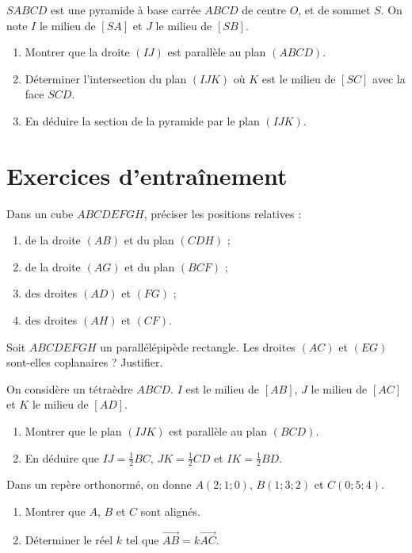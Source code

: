 \exo{}
$SABCD$ est une pyramide à base carrée $ABCD$ de centre $O$, et de sommet $S$. On note $I$ le milieu de $[SA]$ et $J$ le milieu de $[SB]$.
\begin{enumerate}[label=\alph*)]
\item Montrer que la droite $(IJ)$ est parallèle au plan $(ABCD)$.
\item Déterminer l'intersection du plan $(IJK)$ où $K$ est le milieu de $[SC]$ avec la face $SCD$.
\item En déduire la section de la pyramide par le plan $(IJK)$.
\end{enumerate}

\section{Exercices d'entraînement}


\exo{}
Dans un cube $ABCDEFGH$, préciser les positions relatives :
\begin{enumerate}[label=\alph*)]
\item de la droite $(AB)$ et du plan $(CDH)$ ;
\item de la droite $(AG)$ et du plan $(BCF)$ ;
\item des droites $(AD)$ et $(FG)$ ;
\item des droites $(AH)$ et $(CF)$.
\end{enumerate}

\exo{}
Soit $ABCDEFGH$ un parallélépipède rectangle. Les droites $(AC)$ et $(EG)$ sont-elles coplanaires ? Justifier.

\exo{}
On considère un tétraèdre $ABCD$. $I$ est le milieu de $[AB]$, $J$ le milieu de $[AC]$ et $K$ le milieu de $[AD]$.
\begin{enumerate}[label=\alph*)]
\item Montrer que le plan $(IJK)$ est parallèle au plan $(BCD)$.
\item En déduire que $IJ = \frac{1}{2}BC$, $JK = \frac{1}{2}CD$ et $IK = \frac{1}{2}BD$.
\end{enumerate}

\exo{}
Dans un repère orthonormé, on donne $A(2;1;0)$, $B(1;3;2)$ et $C(0;5;4)$.
\begin{enumerate}[label=\alph*)]
\item Montrer que $A$, $B$ et $C$ sont alignés.
\item Déterminer le réel $k$ tel que $\overrightarrow{AB}=k\overrightarrow{AC}$.
\end{enumerate}

